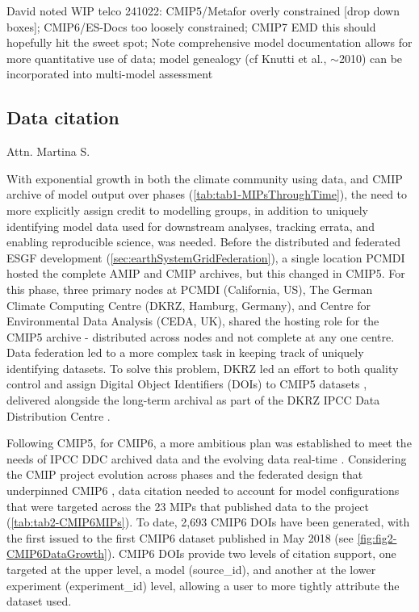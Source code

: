\documentclass[gmd, preprint]{copernicus}
\def\cred#1{{\color{red}#1}}
\begin{document}
\cred{David noted WIP telco 241022: CMIP5/Metafor \citep{guilyardi_cmip5_2011} overly constrained [drop down boxes]; CMIP6/ES-Docs \citep{pascoe_documenting_2020} too loosely constrained; CMIP7 EMD this should hopefully hit the sweet spot; Note comprehensive model documentation allows for more quantitative use of data; model genealogy (cf Knutti et al., ${\sim}$2010) can be incorporated into multi-model assessment}


\subsection{Data citation}
\label{sec:DataCitation}
\cred{Attn. Martina S.}

With exponential growth in both the climate community using data, and CMIP archive of model output over phases (\autoref{tab:tab1-MIPsThroughTime}), the need to more explicitly assign credit to modelling groups, in addition to uniquely identifying model data used for downstream analyses, tracking errata, and enabling reproducible science, was needed. Before the distributed and federated ESGF development (\autoref{sec:earthSystemGridFederation}), a single location PCMDI hosted the complete AMIP and CMIP archives, but this changed in CMIP5. For this phase, three primary nodes at PCMDI (California, US), The German Climate Computing Centre (DKRZ, Hamburg, Germany), and Centre for Environmental Data Analysis (CEDA, UK), shared the hosting role for the CMIP5 archive - distributed across nodes and not complete at any one centre. Data federation led to a more complex task in keeping track of uniquely identifying datasets. To solve this problem, DKRZ led an effort to both quality control and assign Digital Object Identifiers (DOIs) to CMIP5 datasets \citep{stockhause_quality_2012, stockhause_cmip6_2017}, delivered alongside the long-term archival as part of the DKRZ IPCC Data Distribution Centre \citep[IPCC DDC;][]{stockhause_twenty-five_2022}.

Following CMIP5, for CMIP6, a more ambitious plan was established to meet the needs of IPCC DDC archived data and the evolving data real-time \citep{stockhause_cmip6_2017}. Considering the CMIP project evolution across phases and the federated design that underpinned CMIP6 \citep[see \autoref{sec:cmip6ProjectDesign};][]{eyring_overview_2016}, data citation needed to account for model configurations that were targeted across the 23 MIPs that published data to the project (\autoref{tab:tab2-CMIP6MIPs}). To date, 2,693 CMIP6 DOIs have been generated, with the first issued to the first CMIP6 dataset published in May 2018 (see \autoref{fig:fig2-CMIP6DataGrowth}). CMIP6 DOIs provide two levels of citation support, one targeted at the upper level, a model (source\_id), and another at the lower experiment (experiment\_id) level, allowing a user to more tightly attribute the dataset used.
\end{document}

